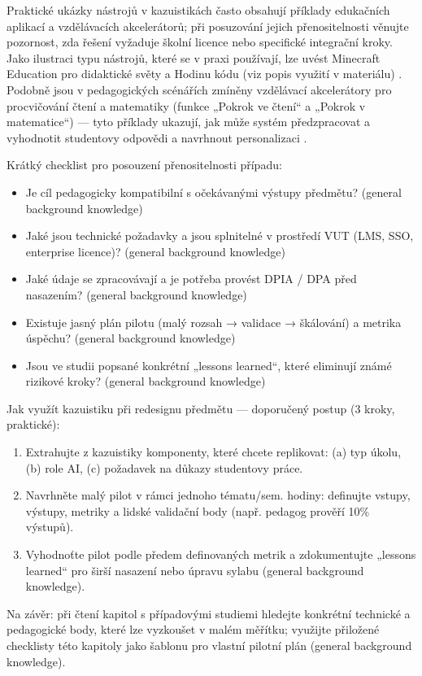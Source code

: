 Praktické ukázky nástrojů v kazuistikách často obsahují příklady edukačních aplikací a vzdělávacích akcelerátorů; při posuzování jejich přenositelnosti věnujte pozornost, zda řešení vyžaduje školní licence nebo specifické integrační kroky. Jako ilustraci typu nástrojů, které se v praxi používají, lze uvést Minecraft Education pro didaktické světy a Hodinu kódu (viz popis využití v materiálu) \cite{kb_ai_101_tipu_pdf_04e4a115_page_15_2}. Podobně jsou v pedagogických scénářích zmíněny vzdělávací akcelerátory pro procvičování čtení a matematiky (funkce „Pokrok ve čtení“ a „Pokrok v matematice“) — tyto příklady ukazují, jak může systém předzpracovat a vyhodnotit studentovy odpovědi a navrhnout personalizaci \cite{kb_ai_101_tipu_pdf_04e4a115_page_7_1, kb_ai_101_tipu_pdf_04e4a115_page_8_1}.
  
Krátký checklist pro posouzení přenositelnosti případu:
\begin{itemize}
  \item Je cíl pedagogicky kompatibilní s očekávanými výstupy předmětu? (general background knowledge)
  \item Jaké jsou technické požadavky a jsou splnitelné v prostředí VUT (LMS, SSO, enterprise licence)? (general background knowledge)
  \item Jaké údaje se zpracovávají a je potřeba provést DPIA / DPA před nasazením? (general background knowledge)
  \item Existuje jasný plán pilotu (malý rozsah → validace → škálování) a metrika úspěchu? (general background knowledge)
  \item Jsou ve studii popsané konkrétní „lessons learned“, které eliminují známé rizikové kroky? (general background knowledge)
\end{itemize}

Jak využít kazuistiku při redesignu předmětu — doporučený postup (3 kroky, praktické):
\begin{enumerate}
  \item Extrahujte z kazuistiky komponenty, které chcete replikovat: (a) typ úkolu, (b) role AI, (c) požadavek na důkazy studentovy práce.
  \item Navrhněte malý pilot v rámci jednoho tématu/sem. hodiny: definujte vstupy, výstupy, metriky a lidské validační body (např. pedagog prověří 10\% výstupů).
  \item Vyhodnoťte pilot podle předem definovaných metrik a zdokumentujte „lessons learned“ pro širší nasazení nebo úpravu sylabu (general background knowledge).
\end{enumerate}

Na závěr: při čtení kapitol s případovými studiemi hledejte konkrétní technické a pedagogické body, které lze vyzkoušet v malém měřítku; využijte přiložené checklisty této kapitoly jako šablonu pro vlastní pilotní plán (general background knowledge).